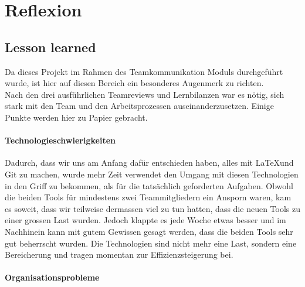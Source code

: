 \chapter{Reflexion}

\section{Lesson learned}

Da dieses Projekt im Rahmen des Teamkommunikation Moduls durchgeführt wurde, ist hier auf diesen Bereich ein besonderes Augenmerk zu richten. \\
Nach den drei ausführlichen Teamreviews und Lernbilanzen war es nötig, sich stark mit den Team und den Arbeitsprozessen auseinanderzusetzen. Einige Punkte werden hier zu Papier gebracht.

\subsubsection{Technologieschwierigkeiten} \label{sec:techn}

Dadurch, dass wir uns am Anfang dafür entschieden haben, alles mit \LaTeX und Git zu machen, wurde mehr Zeit verwendet den Umgang mit diesen Technologien in den Griff zu bekommen, als für die tatsächlich geforderten Aufgaben. Obwohl die beiden Tools für mindestens zwei Teammitgliedern ein Ansporn waren, kam es soweit, dass wir teilweise dermassen viel zu tun hatten, dass die neuen Tools zu einer grossen Last wurden. Jedoch klappte es jede Woche etwas besser und im Nachhinein kann mit gutem Gewissen gesagt werden, dass die beiden Tools sehr gut beherrscht wurden. Die Technologien sind nicht mehr eine Last, sondern eine Bereicherung und tragen momentan zur Effizienzsteigerung bei.

\subsubsection {Organisationsprobleme} \label{sec:orgprob}

